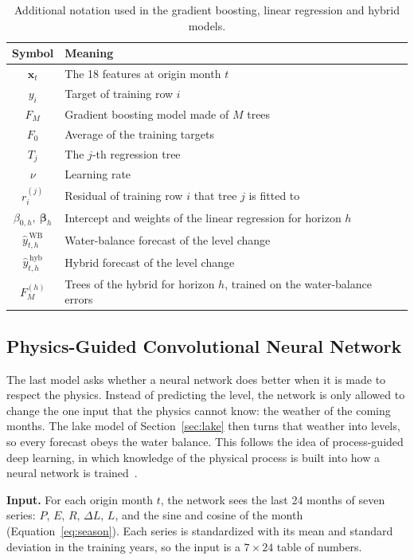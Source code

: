 \documentclass{article}
\begin{document}
\begin{table}[htbp]
\centering
\caption{Additional notation used in the gradient boosting, linear regression and hybrid models.}
\label{tab:notation-gb}
\renewcommand{\arraystretch}{1.3}
\begin{tabular}{||c|l||}
\hline\hline
Symbol & Meaning \\
\hline\hline
$\mathbf{x}_t$ & The 18 features at origin month $t$ \\
$y_i$ & Target of training row $i$ \\
$F_M$ & Gradient boosting model made of $M$ trees \\
$F_0$ & Average of the training targets \\
$T_j$ & The $j$-th regression tree \\
$\nu$ & Learning rate \\
$r^{(j)}_i$ & Residual of training row $i$ that tree $j$ is fitted to \\
$\beta_{0,h},\ \boldsymbol{\beta}_h$ & Intercept and weights of the linear regression for horizon $h$ \\
$\hat y^{\,\mathrm{WB}}_{t,h}$ & Water-balance forecast of the level change \\
$\hat y^{\,\mathrm{hyb}}_{t,h}$ & Hybrid forecast of the level change \\
$F^{(h)}_M$ & Trees of the hybrid for horizon $h$, trained on the water-balance errors \\
\hline\hline
\end{tabular}
\end{table}

\subsection{Physics-Guided Convolutional Neural Network}
\label{sec:cnn}

The last model asks whether a neural network does better when it is made to respect the
physics. Instead of predicting the level, the network is only allowed to change the one input
that the physics cannot know: the weather of the coming months. The lake model of
Section~\ref{sec:lake} then turns that weather into levels, so every forecast obeys the water
balance. This follows the idea of process-guided deep learning, in which knowledge of the
physical process is built into how a neural network is trained~\cite{read2019}.

\textbf{Input.} For each origin month $t$, the network sees the last 24 months of seven series:
$P$, $E$, $R$, $\Delta L$, $L$, and the sine and cosine of the month
(Equation~\ref{eq:season}). Each series is standardized with its mean and standard deviation in
the training years, so the input is a $7 \times 24$ table of numbers.
\end{document}
